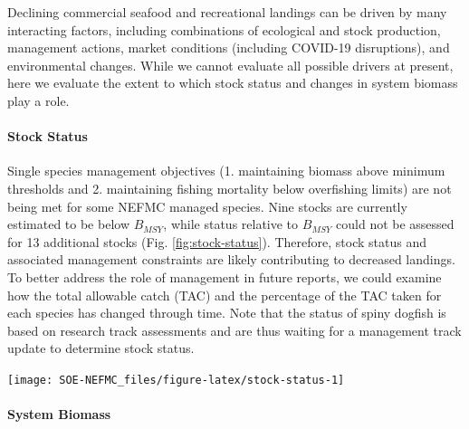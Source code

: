 \documentclass[
  10pt,
]{article}
\let\origfigure\figure
\let\endorigfigure\endfigure
\renewenvironment{figure}[1][2] {
    \expandafter\origfigure\expandafter[H]
} {
    \endorigfigure
}
\begin{document}
Declining commercial seafood and recreational landings can be driven by many interacting factors, including combinations of ecological and stock production, management actions, market conditions (including COVID-19 disruptions), and environmental changes. While we cannot evaluate all possible drivers at present, here we evaluate the extent to which stock status and changes in system biomass play a role.

\hypertarget{stock-status}{%
\paragraph{Stock Status}\label{stock-status}}

Single species management objectives (1. maintaining biomass above minimum thresholds and 2. maintaining fishing mortality below overfishing limits) are not being met for some NEFMC managed species. Nine stocks are currently estimated to be below \(B_{MSY}\), while status relative to \(B_{MSY}\) could not be assessed for 13 additional stocks (Fig. \ref{fig:stock-status}). Therefore, stock status and associated management constraints are likely contributing to decreased landings. To better address the role of management in future reports, we could examine how the total allowable catch (TAC) and the percentage of the TAC taken for each species has changed through time. Note that the status of spiny dogfish is based on research track assessments and are thus waiting for a management track update to determine stock status.

\begin{figure}

{\centering \texttt{[image: SOE-NEFMC\_files/figure-latex/stock-status-1]} 

}

\caption{Summary of single species status for NEFMC and jointly federally managed stocks (Goosefish and Spiny dogfish).  The dotted vertical line is the target biomass reference point of B\textsubscript{MSY}.  The dashed lines are the management thresholds of B\textsubscript{MSY} (vertical) or F\textsubscript{MSY} (horizontal).  Text color denotes which quadrant of the plot the stocks are in with orange text below F\textsubscript{MSY} and B\textsubscript{MSY}, green above F\textsubscript{MSY} and below B\textsubscript{MSY}, and blue above both F\textsubscript{MSY} and B\textsubscript{MSY}.}\label{fig:stock-status}
\end{figure}

\hypertarget{system-biomass}{%
\paragraph{System Biomass}\label{system-biomass}}
\end{document}
